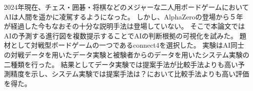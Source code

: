 \abstract
2024年現在、チェス・囲碁・将棋などのメジャーな二人用ボードゲームにおいてAIは人間を遥かに凌駕するようになった\cite{Nikkei}\cite{deepBlue}\cite{dennou}。
しかし、AlphaZero\cite{AlphaZero}の登場から５年が経過した今もなおその十分な説明手法は登場していない。
そこで本論文ではAIの予測する進行図を複数提示することでAIの判断根拠の可視化を試みた。
題材として対戦型ボードゲームの一つであるconnect4を選択した。
実験はAI同士の対戦データを用いたデータ実験と被験者からのデータを用いたシステム実験の二種類を行った。
結果としてデータ実験では提案手法が比較手法よりも高い予測精度を示し、システム実験では提案手法は？において比較手法よりも高い評価を得た。